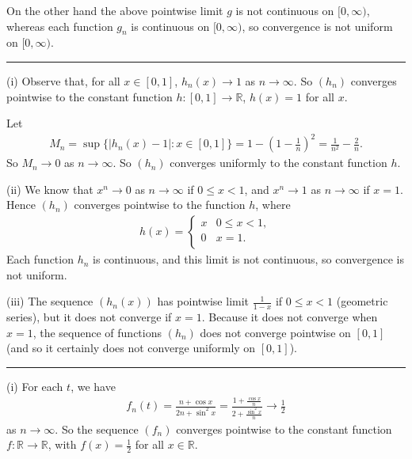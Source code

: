 \documentclass[letterpaper,10pt,english]{jupyterBook}
\begin{document}
On the other hand the above pointwise limit \(g\) is not continuous on \([0,\infty )\), whereas each function \(g_n\) is continuous on \([0,\infty )\), so convergence is not uniform on \([0,\infty )\).


\bigskip\hrule\bigskip


\sphinxAtStartPar
{\hyperref[\detokenize{Problems:id57}]{}}
(i) Observe that, for all \(x\in[0,1]\), \(h_n(x)\rightarrow 1\) as \(n\rightarrow \infty\).
So \((h_n)\) converges pointwise to the constant function \(h:[0,1]\to\mathbb{R}\), \(h(x)=1\) for all \(x\).

\sphinxAtStartPar
Let
\begin{equation*}
\begin{split}
M_n = \sup \{ |h_n(x)-1| : x\in [0,1] \} = 1 - \left(1-\frac{1}{n}\right)^2 =\frac{1}{n^2}-\frac{2}{n}.
\end{split}
\end{equation*}
\sphinxAtStartPar
So \(M_n\rightarrow 0\) as \(n\rightarrow \infty\). So \((h_n)\) converges uniformly to the constant function \(h\).

\sphinxAtStartPar
(ii) We know that \(x^n \rightarrow 0\) as \(n\rightarrow \infty\) if \(0\leq x<1\), and \(x^n\rightarrow 1\) as \(n\rightarrow \infty\) if \(x=1\). Hence \((h_n)\) converges pointwise to the function \(h\), where
\begin{equation*}
\begin{split}
h (x) =\left\{ \begin{array}{ll}
x & 0\leq x<1, \\
0 & x=1. \\
\end{array} \right.
\end{split}
\end{equation*}
\sphinxAtStartPar
Each function \(h_n\) is continuous, and this limit is not continuous, so convergence is not uniform.

\sphinxAtStartPar
(iii) The sequence \((h_n(x))\) has pointwise limit \(\frac{1}{1-x}\) if \(0\leq x<1\) (geometric series), but it does not converge if \(x=1\). Because it does not converge when \(x=1\), the sequence of functions \((h_n)\) does not converge pointwise  on \([0,1]\) (and so it certainly does not converge uniformly on \([0,1]\)).


\bigskip\hrule\bigskip


\sphinxAtStartPar
{\hyperref[\detokenize{Problems:id58}]{}}
(i) For each \(t\), we have
\begin{equation*}
\begin{split}
f_n(t) = \frac{n+\cos x}{2n+\sin^2 x} = \frac{1+\frac{\cos x}{n}}{2+\frac{\sin^2 x}{n}} \rightarrow \frac{1}{2}
\end{split}
\end{equation*}
\sphinxAtStartPar
as \(n\rightarrow \infty\). So the sequence \((f_n)\) converges pointwise to the constant function \(f:\mathbb{R}\to\mathbb{R}\), with \(f(x)=\frac{1}{2}\) for all \(x\in\mathbb{R}\).
\end{document}
